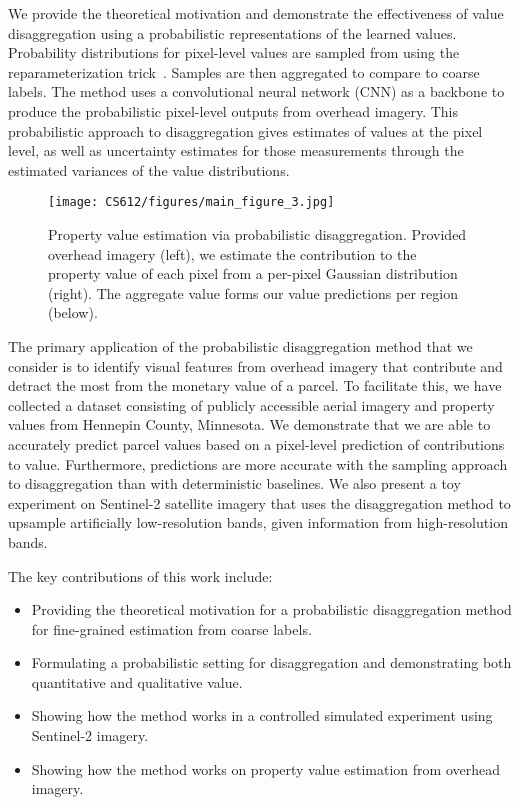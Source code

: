 \documentclass[10pt,twocolumn,letterpaper]{article}
\begin{document}
We provide the theoretical motivation and demonstrate the effectiveness of value disaggregation using a probabilistic representations of the learned values. Probability distributions for pixel-level values are sampled from using the reparameterization trick~\cite{Kingma2014AutoEncodingVB}. Samples are then aggregated to compare to coarse labels. The method uses a convolutional neural network (CNN) as a backbone to produce the probabilistic pixel-level outputs from overhead imagery. This probabilistic approach to disaggregation gives estimates of values at the pixel level, as well as uncertainty estimates for those measurements through the estimated variances of the value distributions. 

\begin{figure}[t]
    \centering
    \texttt{[image: CS612/figures/main\_figure\_3.jpg]}
    \caption{Property value estimation via probabilistic disaggregation. Provided overhead imagery (left), we estimate the contribution to the property value of each pixel from a per-pixel Gaussian distribution (right). The aggregate value forms our value predictions per region (below).}
    \label{fig:overview_image}
\end{figure}

The primary application of the probabilistic disaggregation method that we consider is to identify visual features from overhead imagery that contribute and detract the most from the monetary value of a parcel. To facilitate this, we have collected a dataset consisting of publicly accessible aerial imagery and property values from Hennepin County, Minnesota. We demonstrate that we are able to accurately predict parcel values based on a pixel-level prediction of contributions to value. Furthermore, predictions are more accurate with the sampling approach to disaggregation than with deterministic baselines. We also present a toy experiment on Sentinel-2 satellite imagery that uses the disaggregation method to upsample artificially low-resolution bands, given information from high-resolution bands.

The key contributions of this work include:
\begin{itemize}
    \item Providing the theoretical motivation for a probabilistic disaggregation method for fine-grained estimation from coarse labels.
    \item Formulating a probabilistic setting for disaggregation and demonstrating both quantitative and qualitative value.
    \item Showing how the method works in a controlled simulated experiment using Sentinel-2 imagery. 
    \item Showing how the method works on property value estimation from overhead imagery.
\end{itemize}
\end{document}
